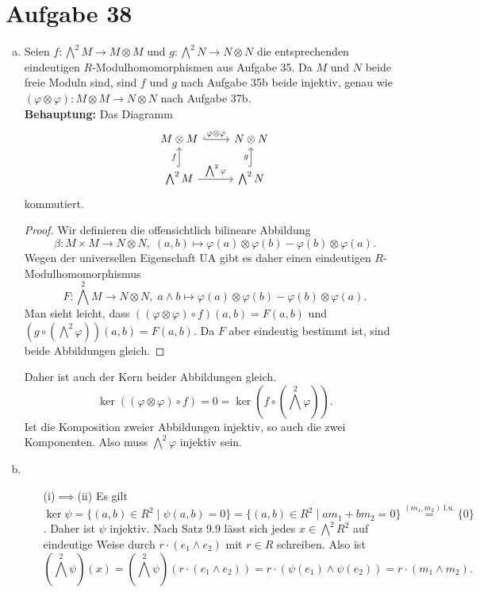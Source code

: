 \documentclass{article}
\theoremstyle{definition}
\begin{document}
\section*{Aufgabe 38}
\begin{enumerate}[(a)]
    \item Seien $f\colon \textstyle{\bigwedge^2}M \to M \otimes M$ und $g\colon \textstyle{\bigwedge^2}N \to N \otimes N$ die entsprechenden eindeutigen $R$-Modulhomomorphismen aus Aufgabe 35. Da $M$ und $N$ beide freie Moduln sind, sind $f$ und $g$ nach Aufgabe 35b beide injektiv, genau wie $(\varphi \otimes \varphi)\colon M\otimes M\to N\otimes N$ nach Aufgabe 37b.\\
    \textbf{Behauptung:} Das Diagramm 
    \[\begin{tikzcd}
        M\otimes M \ar[r,hook,"\varphi \otimes \varphi"] & N\otimes N\\
        \bigwedge^2M \ar[u, hook,"f"] \ar[r,"\bigwedge^2 \varphi"] & \bigwedge^2 N \ar[u,hook,"g"]
    \end{tikzcd}\] kommutiert.
    \begin{proof}
        Wir definieren die offensichtlich bilineare Abbildung
        \[
            \beta\colon M\times M\to N\otimes N,\; (a,b) \mapsto \varphi(a)\otimes \varphi(b) - \varphi(b)\otimes\varphi(a).
        \]
        Wegen der universellen Eigenschaft UA gibt es daher einen eindeutigen $R$-Modulhomomorphismus
        \[
            F\colon \textstyle{\bigwedge^2}M \to N\otimes N,\; a\wedge b \mapsto  \varphi(a)\otimes \varphi(b) - \varphi(b)\otimes\varphi(a).
        \]
        Man sieht leicht, dass $((\varphi \otimes \varphi) \circ f)(a,b) = F(a,b)$ und $(g\circ(\textstyle{\bigwedge^2} \varphi))(a,b) = F(a,b)$. Da $F$ aber eindeutig bestimmt ist, sind beide Abbildungen gleich.
    \end{proof}
    Daher ist auch der Kern beider Abbildungen gleich. 
    \[
        \ker ((\varphi \otimes \varphi) \circ f) = 0 = \ker (f\circ(\textstyle{\bigwedge^2} \varphi)).
    \]
    Ist die Komposition zweier Abbildungen injektiv, so auch die zwei Komponenten. Also muss $\textstyle{\bigwedge^2} \varphi$ injektiv sein.
    \item \ \begin{itemize}
        \item[(i)$\implies$(ii)] Es gilt $\ker \psi = \{(a,b)\in R^2 \mid \psi(a,b) = 0\} = \{(a,b)\in R^2\mid am_1 + bm_2 = 0\} \overset{(m_1,m_2)\text{ l.u.}}{=} \{0\}$. Daher ist $\psi$ injektiv. Nach Satz 9.9 lässt sich jedes $x\in \textstyle{\bigwedge^2}R^2$ auf eindeutige Weise durch $r\cdot \left(e_1\wedge e_2\right)$ mit $r\in R$ schreiben. Also ist \[(\textstyle{\bigwedge^2} \psi)(x) = (\textstyle{\bigwedge^2} \psi)(r\cdot (e_1\wedge e_2)) = r \cdot (\psi(e_1)\wedge \psi(e_2)) = r\cdot (m_1\wedge m_2).\]

\end{itemize}
\end{enumerate}
\end{document}
